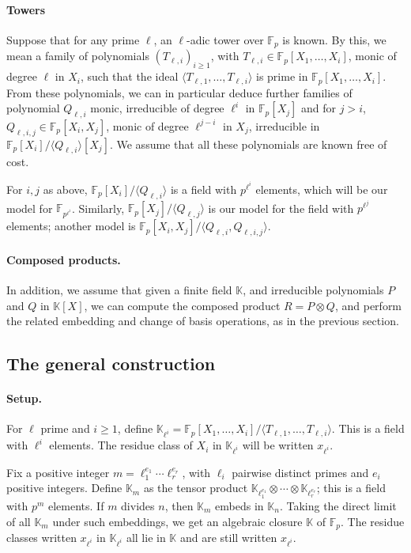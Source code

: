 \documentclass[12pt]{article}
\def\F {\ensuremath{\mathbb{F}}}
\def\K {\ensuremath{\mathbb{K}}}
\begin{document}
\paragraph{Towers}
Suppose that for any prime $\ell$, an $\ell$-adic tower over $\F_p$ is
known. By this, we mean a family of polynomials $(T_{\ell,i})_{i \ge
  1}$, with $T_{\ell,i} \in \F_p[X_1,\dots,X_i]$, monic of degree
$\ell$ in $X_i$, such that the ideal $\langle
T_{\ell,1},\dots,T_{\ell,i} \rangle$ is prime in
$\F_p[X_1,\dots,X_i]$. From these polynomials, we can in particular
deduce further families of polynomial $Q_{\ell,i}$ monic, irreducible
of degree $\ell^i$ in $\F_p[X_j]$ and for $j > i$, $Q_{\ell,i,j}
\in\F_p[X_i,X_j]$, monic of degree $\ell^{j-i}$ in $X_j$, irreducible
in $\F_p[X_i]/\langle Q_{\ell,i}\rangle[X_j]$. We assume that all
these polynomials are known free of cost.

For $i,j$ as above, $\F_p[X_i]/\langle Q_{\ell,i} \rangle$ is a field
with $p^{\ell^i}$ elements, which will be our model for
$\F_{p^{\ell^i}}$. Similarly, $\F_p[X_j]/\langle Q_{\ell,j}\rangle$ is
our model for the field with $p^{\ell^j}$ elements; another model is
$\F_p[X_i,X_j]/\langle Q_{\ell,i}, Q_{\ell,i,j}\rangle$.

\paragraph{Composed products.} In addition, we assume that given a finite field
$\K$, and irreducible polynomials $P$ and $Q$ in $\K[X]$, we can
compute the composed product $R = P \otimes Q$, and perform the
related embedding and change of basis operations, as in the previous
section.


\subsection{The general construction}

\paragraph{Setup.} For $\ell$ prime and $i \ge 1$, define
$\K_{\ell^i}=\F_p[X_1,\dots,X_i]/\langle
T_{\ell,1},\dots,T_{\ell,i}\rangle$. This is a field with $\ell^i$
elements.  The residue class of $X_i$ in $\K_{\ell^i}$ will be written
$x_{\ell^i}$.

Fix a positive integer $m=\ell_1^{e_1}\cdots \ell_r^{e_r}$, with
$\ell_i$ pairwise distinct primes and $e_i$ positive integers.  Define
$\K_m$ as the tensor product $\K_{\ell_1^{e_1}} \otimes \cdots \otimes
\K_{\ell_r^{e_r}}$; this is a field with $p^m$ elements.  If $m$
divides $n$, then $\K_m$ embeds in $\K_n$. Taking the direct limit of
all $\K_m$ under such embeddings, we get an algebraic closure $\K$ of
$\F_p$. The residue classes written $x_{\ell^i}$ in $\K_{\ell^i}$ all
lie in $\K$ and are still written $x_{\ell^i}$.
\end{document}
